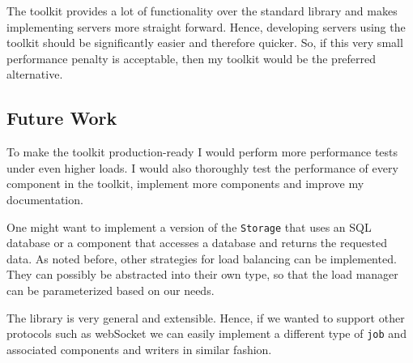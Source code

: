 The toolkit provides a lot of functionality over the
standard library and makes implementing servers more straight forward. 
Hence, developing servers using the toolkit should be
significantly easier and therefore quicker. So, if this very small performance
penalty is acceptable, then my toolkit would be the preferred alternative.

\subsection{Future Work}
To make the toolkit production-ready I would perform  more performance 
tests under even higher loads. I would also thoroughly test the performance of
every component in the toolkit, implement more components and improve my documentation. 

One might want to implement a version of the \texttt{Storage}
that uses an SQL database or a component that accesses a database and 
returns the requested data. As noted before, other strategies 
for load balancing can be implemented. 
They can possibly be abstracted into their own type, so that the
load manager can be parameterized based on our needs.

The library is very general and extensible. Hence, if we wanted to support 
other protocols such as webSocket we can easily implement a different 
type of \texttt{job} and associated components and writers in similar fashion.

